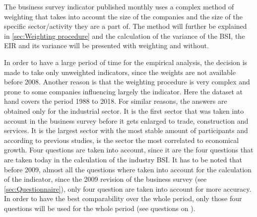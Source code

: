 \documentclass[12pt,a4paper,oneside]{book}
\begin{document}
The business survey indicator published monthly uses a complex method of weighting that takes into account the size of the companies and the size of the specific sector/activity they are a part of. The method will further be explained in \autoref{sec:Weighting procedure} and the calculation of the variance of the BSI, the EIR and its variance will be presented with weighting and without.


In order to have a large period of time for the empirical analysis, the decision is made to take only unweighted indicators, since the weights are not available before 2008. Another reason is that the weighting procedure is very complex and prone to some companies influencing largely the indicator. 
Here the dataset at hand covers the period 1988 to 2018.
For similar reasons, the answers are obtained only for the industrial sector.
It is the first sector that was taken into account in the business survey before it gets enlarged to trade, construction and services. It is the largest sector with the most stable amount of participants and according to previous studies, is the sector the most correlated to economical growth.
Four questions are taken into account, since it are the four questions that are taken today in the calculation of the industry BSI. 
It has to be noted that before 2009, almost all the questions where taken into account for the calculation of the indicator, since the 2009 revision of the business survey (see \autoref{sec:Questionnaire}), only four question are taken into account for more accuracy. In order to have the best comparability over the whole period, only those four questions will be used for the whole period (see questions on ).

\end{document}
